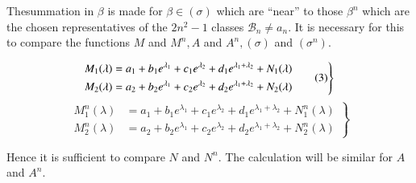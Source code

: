 The\pageoriginale summation in $\beta$ is made for $\beta \in (\sigma )$ which are
``near'' to those $\beta^n$ which are the chosen representatives of the
$2n^2 - 1$ classes $\mathscr{B}_n \neq a_n$. It is necessary for this
to compare the functions $M$ and $M^n, A$ and $A^n, (\sigma)$ and
$(\sigma^n)$. 


\begin{equation}
  \left.
  \begin{aligned}
    M_1(\lambda ) & =  a_1 + b_1 e^{\lambda_1} + c_1 e^{\lambda_2} +
    d_1 e^{\lambda_1 + \lambda_2} + N_1 (\lambda ) \\ 
    M_2(\lambda ) & = a_2 + b_2 e^{\lambda_1} + c_2 e^{\lambda_2} +
    d_2 e^{\lambda_1 + \lambda_2} + N_2 (\lambda ) 
  \end{aligned} \tag{3}\label{part2:chap3:sec8:eq3}
  \right \}\\ 
\end{equation}
\begin{equation}
  \left.
  \begin{aligned}
    M^n_1(\lambda ) & =  a_1 + b_1 e^{\lambda_1} + c_1 e^{\lambda_2} +
    d_1 e^{\lambda_1 + \lambda_2} + N^n_1 (\lambda ) \\ 
    M^n_2 (\lambda ) & = a_2 + b_2 e^{\lambda_1} + c_2 e^{\lambda_2} +
    d_2 e^{\lambda_1 + \lambda_2} + N^n_2 (\lambda ) 
  \end{aligned} \tag{4}\label{part2:chap3:sec8:eq4}
  \right \} 
\end{equation}
 
 Hence it is sufficient to compare $N$ and $N^n$. The calculation will
 be similar for $A$ and $A^n$. 

